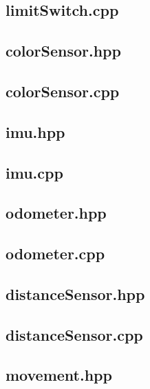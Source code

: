 \subsection{limitSwitch.cpp}

\subsection{colorSensor.hpp}

\subsection{colorSensor.cpp}

\subsection{imu.hpp}

\subsection{imu.cpp}

\subsection{odometer.hpp}

\subsection{odometer.cpp}

\subsection{distanceSensor.hpp}

\subsection{distanceSensor.cpp}

\subsection{movement.hpp}

